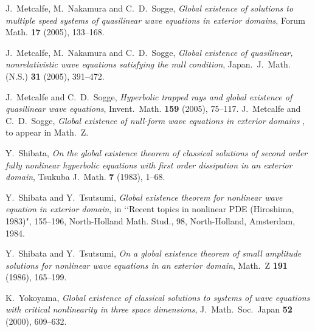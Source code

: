 \documentclass[12pt]{amsart}
\numberwithin{equation}{section}
\begin{document}
\begin{thebibliography}{99}
J.~Metcalfe, M.~Nakamura and C.~D.~Sogge,
{\it
Global existence of solutions to multiple speed systems
of quasilinear wave equations in exterior domains},
 Forum Math.
{\bf 17} (2005), 133--168.

J.~Metcalfe, M.~Nakamura and C.~D.~Sogge,
{\it
Global existence of quasilinear, nonrelativistic wave equations
satisfying the null condition},
 Japan.~J.~Math. (N.S.) 
{\bf 31} (2005), 391--472.

J.~Metcalfe and C.~D.~Sogge,
{\it
Hyperbolic trapped rays and global existence of quasilinear wave equations},
 Invent.~Math.
{\bf 159} (2005), 75--117.
J.~Metcalfe and C.~D.~Sogge,
{\it Global existence of null-form wave equations in exterior domains
}, to appear in Math.~Z.

Y.~Shibata,
{\it On the global existence theorem of classical solutions of
second order fully nonlinear hyperbolic equations with first order
dissipation in an exterior domain}, Tsukuba J.~Math. {\bf 7}
(1983), 1--68.

Y.~Shibata and Y.~Tsutsumi,
{\it
Global existence theorem for nonlinear wave equation in exterior domain},
in \lq\lq Recent topics in nonlinear PDE (Hiroshima, 1983)", 
155--196, North-Holland Math. Stud., 98, North-Holland, Amsterdam, 1984.

Y.~Shibata and Y.~Tsutsumi,
{\it
On a global existence theorem of small amplitude solutions
for nonlinear wave equations in an exterior domain},
 Math.~Z
{\bf 191} (1986), 165--199.

K.~Yokoyama,
   {\it Global existence of classical solutions to 
              systems of wave equations with critical nonlinearity
              in three space dimensions},
  J.~Math.~Soc.~Japan {\bf 52} (2000), 609--632.
\end{thebibliography}
\end{document}
